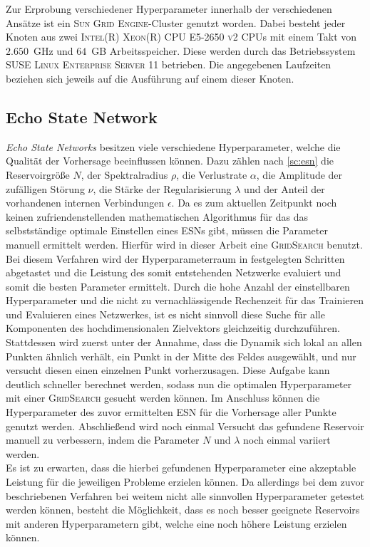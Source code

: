 Zur Erprobung verschiedener Hyperparameter innerhalb der verschiedenen Ansätze ist ein \textsc{Sun Grid Engine}-Cluster genutzt worden. Dabei besteht jeder Knoten aus zwei \textsc{Intel(R) Xeon(R) CPU E5-2650 v2} CPUs mit einem Takt von $2.650$~GHz und $64$~GB Arbeitsspeicher. Diese werden durch das Betriebssystem \textsc{SUSE Linux Enterprise Server 11} betrieben. Die angegebenen Laufzeiten beziehen sich jeweils auf die Ausführung auf einem dieser Knoten. 


\FloatBarrier
\subsection{Echo State Network}
\label{sec:exp_general_esn}
\textit{Echo State Networks} besitzen viele verschiedene Hyperparameter, welche die Qualität der Vorhersage beeinflussen können. Dazu zählen nach \ref{sc:esn} die Reservoirgröße $N$, der Spektralradius $\rho$, die Verlustrate $\alpha$, die Amplitude der zufälligen Störung $\nu$, die Stärke der Regularisierung $\lambda$ und der Anteil der vorhandenen internen Verbindungen $\epsilon$. Da es zum aktuellen Zeitpunkt noch keinen zufriendenstellenden mathematischen Algorithmus für das das selbstständige optimale Einstellen eines \textsc{ESN}s gibt, müssen die Parameter manuell ermittelt werden. Hierfür wird in dieser Arbeit eine \textsc{GridSearch} benutzt. Bei diesem Verfahren wird der Hyperparameterraum in festgelegten Schritten abgetastet und die Leistung des somit entstehenden Netzwerke evaluiert und somit die besten Parameter ermittelt. Durch die hohe Anzahl der einstellbaren Hyperparameter und die nicht zu vernachlässigende Rechenzeit für das Trainieren und Evaluieren eines Netzwerkes, ist es nicht sinnvoll diese Suche für alle Komponenten des hochdimensionalen Zielvektors gleichzeitig durchzuführen. Stattdessen wird zuerst unter der Annahme, dass die Dynamik sich lokal an allen Punkten ähnlich verhält, ein Punkt in der Mitte des Feldes ausgewählt, und nur versucht diesen einen einzelnen Punkt vorherzusagen. Diese Aufgabe kann deutlich schneller berechnet werden, sodass nun die optimalen Hyperparameter mit einer \textsc{GridSearch} gesucht werden können. Im Anschluss können die Hyperparameter des  zuvor ermittelten \textsc{ESN} für die Vorhersage aller Punkte genutzt werden. Abschließend wird noch einmal Versucht das gefundene Reservoir manuell zu verbessern, indem die Parameter $N$ und $\lambda$ noch einmal variiert werden.\\
Es ist zu erwarten, dass die hierbei gefundenen Hyperparameter eine akzeptable Leistung für die jeweiligen Probleme erzielen können. Da allerdings bei dem zuvor beschriebenen Verfahren bei weitem nicht alle sinnvollen Hyperparameter getestet werden können, besteht die Möglichkeit, dass es noch besser geeignete Reservoirs mit anderen Hyperparametern gibt, welche eine noch höhere Leistung erzielen können.\\

